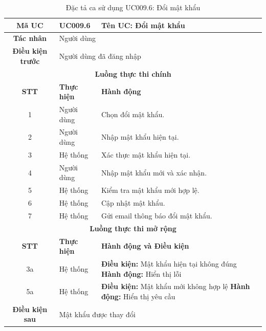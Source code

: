 \begin{table}[H]
    \centering
    \label{tab:uc009-6}
    \begin{tabularx}{\textwidth}{|c|p{3.5cm}|X|}
        \hline
        \rowcolor{headergreen} 
        \textbf{Mã UC} & \textbf{UC009.6} & \textbf{Tên UC: Đổi mật khẩu} \\ \hline
        \textbf{Tác nhân} & \multicolumn{2}{l|}{Người dùng} \\ \hline
        \textbf{Điều kiện trước} & \multicolumn{2}{X|}{Người dùng đã đăng nhập} \\ \hline
        
        \multicolumn{3}{|c|}{\cellcolor{headerorange}\textbf{Luồng thực thi chính}} \\ \hline
        \rowcolor{graybg} \textbf{STT} & \textbf{Thực hiện} & \textbf{Hành động} \\ \hline
        1 & Người dùng & Chọn đổi mật khẩu. \\ \hline
        2 & Người dùng & Nhập mật khẩu hiện tại. \\ \hline
        3 & Hệ thống & Xác thực mật khẩu hiện tại. \\ \hline
        4 & Người dùng & Nhập mật khẩu mới và xác nhận. \\ \hline
        5 & Hệ thống & Kiểm tra mật khẩu mới hợp lệ. \\ \hline
        6 & Hệ thống & Cập nhật mật khẩu. \\ \hline
        7 & Hệ thống & Gửi email thông báo đổi mật khẩu. \\ \hline
        
        \multicolumn{3}{|c|}{\cellcolor{headerorange}\textbf{Luồng thực thi mở rộng}} \\ \hline
        \rowcolor{graybg} \textbf{STT} & \textbf{Thực hiện} & \textbf{Hành động và Điều kiện} \\ \hline
        3a & Hệ thống & \textbf{Điều kiện:} Mật khẩu hiện tại không đúng \newline \textbf{Hành động:} Hiển thị lỗi \\ \hline
        5a & Hệ thống & \textbf{Điều kiện:} Mật khẩu mới không hợp lệ \newline \textbf{Hành động:} Hiển thị yêu cầu \\ \hline
        
        \textbf{Điều kiện sau} & \multicolumn{2}{X|}{Mật khẩu được thay đổi} \\ \hline
    \end{tabularx}
    \caption{Đặc tả ca sử dụng UC009.6: Đổi mật khẩu}
\end{table}


